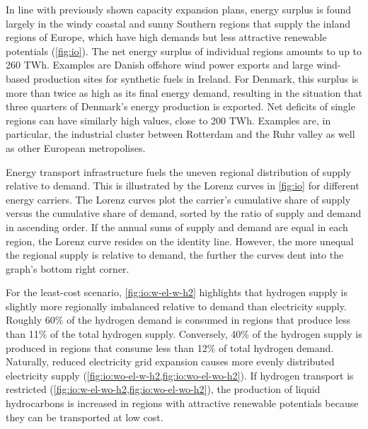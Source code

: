 In line with previously shown capacity expansion plans, energy surplus is found
largely in the windy coastal and sunny Southern regions that supply the inland
regions of Europe, which have high demands but less attractive renewable
potentials (\cref{fig:io}). The net energy surplus of individual regions amounts
to up to 260 TWh. Examples are Danish offshore wind power exports and large
wind-based production sites for synthetic fuels in Ireland. For Denmark, this
surplus is more than twice as high as its final energy demand, resulting in the
situation that three quarters of Denmark's energy production is exported. Net
deficits of single regions can have similarly high values, close to 200 TWh.
Examples are, in particular, the industrial cluster between Rotterdam and the
Ruhr valley as well as other European metropolises.

Energy transport infrastructure fuels the uneven regional distribution of supply
relative to demand. This is illustrated by the Lorenz curves in
\cref{fig:io} for different energy carriers. The
Lorenz curves plot the carrier's cumulative share of supply versus the
cumulative share of demand, sorted by the ratio of supply and demand in
ascending order. If the annual sums of supply and demand are equal in each
region, the Lorenz curve resides on the identity line. However, the more unequal
the regional supply is relative to demand, the further the curves dent into the
graph's bottom right corner.

For the least-cost scenario, \cref{fig:io:w-el-w-h2} highlights that hydrogen
supply is slightly more regionally imbalanced relative to demand than
electricity supply. Roughly 60\% of the hydrogen demand is consumed in regions
that produce less than 11\% of the total hydrogen supply. Conversely, 40\% of
the hydrogen supply is produced in regions that consume less than 12\% of total
hydrogen demand. Naturally, reduced electricity grid expansion causes more
evenly distributed electricity supply
(\cref{fig:io:wo-el-w-h2,fig:io:wo-el-wo-h2}). If hydrogen transport is
restricted (\cref{fig:io:w-el-wo-h2,fig:io:wo-el-wo-h2}), the production of
liquid hydrocarbons is increased in regions with attractive renewable potentials
because they can be transported at low cost.


